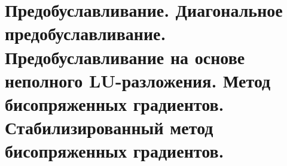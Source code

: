 \documentclass[__main__.tex]{subfiles}
\begin{document}
\section{Предобуславливание. Диагональное предобуславливание. Предобуславливание на основе неполного LU-разложения. Метод бисопряженных градиентов. Стабилизированный метод бисопряженных градиентов.}
\end{document}
